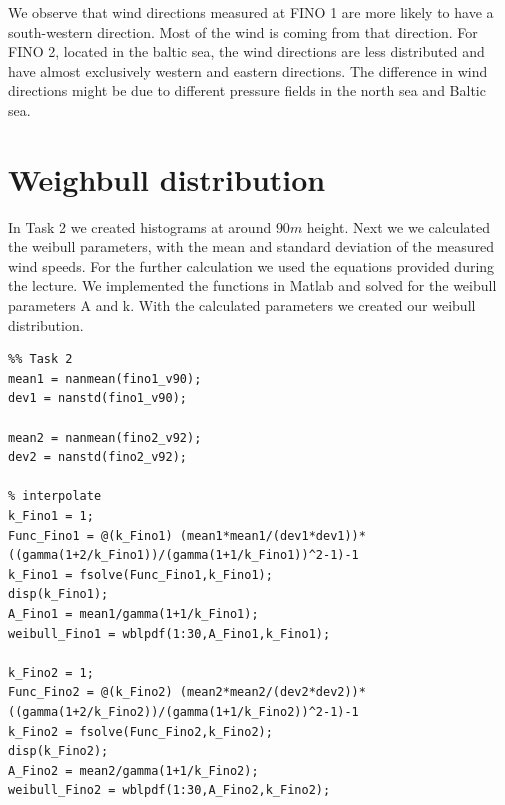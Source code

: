 \documentclass[10pt]{article}
\begin{document}
We observe that wind directions measured at FINO 1 are more likely to have a south-western direction. Most of the wind is coming from that direction. For FINO 2, located in the baltic sea, the wind directions are less distributed  and have almost exclusively western and eastern directions.
The difference in wind directions might be due to different pressure fields in the north sea and Baltic sea.
\newpage
\section{Weighbull distribution}
In Task 2 we created histograms at around $90m$ height. Next we we calculated the weibull parameters, with the mean and standard deviation of the measured wind speeds. For the further calculation we used the equations provided during the lecture. We implemented the functions in Matlab and solved for the weibull parameters A and k. With the calculated parameters we created our weibull distribution.


\begin{lstlisting}
%% Task 2
mean1 = nanmean(fino1_v90);
dev1 = nanstd(fino1_v90);

mean2 = nanmean(fino2_v92);
dev2 = nanstd(fino2_v92);

% interpolate
k_Fino1 = 1;
Func_Fino1 = @(k_Fino1) (mean1*mean1/(dev1*dev1))*((gamma(1+2/k_Fino1))/(gamma(1+1/k_Fino1))^2-1)-1 
k_Fino1 = fsolve(Func_Fino1,k_Fino1);
disp(k_Fino1);
A_Fino1 = mean1/gamma(1+1/k_Fino1);
weibull_Fino1 = wblpdf(1:30,A_Fino1,k_Fino1);

k_Fino2 = 1;
Func_Fino2 = @(k_Fino2) (mean2*mean2/(dev2*dev2))*((gamma(1+2/k_Fino2))/(gamma(1+1/k_Fino2))^2-1)-1 
k_Fino2 = fsolve(Func_Fino2,k_Fino2);
disp(k_Fino2);
A_Fino2 = mean2/gamma(1+1/k_Fino2);
weibull_Fino2 = wblpdf(1:30,A_Fino2,k_Fino2);
\end{lstlisting}
\end{document}
